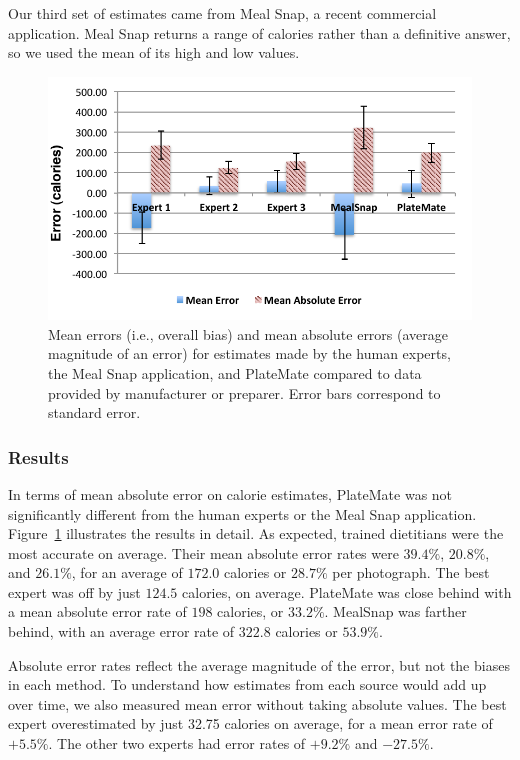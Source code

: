 Our third set of estimates came from Meal Snap, a recent commercial application.  Meal Snap returns a range of calories rather than a definitive answer, so we used the mean of its high and low values.  

\begin{figure}
\begin{center}
   \includegraphics[width=\columnwidth]{figs/error-both}
   \caption{Mean errors (i.e., overall bias) and mean absolute errors (average magnitude of an error) for estimates made by the human experts, the Meal Snap application, and PlateMate compared to data provided by manufacturer or preparer.  Error bars correspond to standard error.}
   \label{fig:error}
\end{center}
\end{figure}

\subsubsection{Results}

In terms of mean absolute error on calorie estimates, PlateMate was not significantly different from the human experts or the Meal Snap application.  Figure~\ref{fig:error} illustrates the results in detail.  
As expected, trained dietitians were the most accurate on average. Their mean absolute error rates were $39.4\%$, $20.8\%$, and $26.1\%$, for an average of $172.0$ calories or $28.7\%$ per photograph. The best expert was off by just $124.5$ calories, on average. PlateMate was close behind with a mean absolute error rate of $198$ calories, or $33.2\%$.  MealSnap was farther behind, with an average error rate of $322.8$ calories or $53.9\%$.

Absolute error rates reflect the average magnitude of the error, but not the biases in each method. To understand how estimates from each source would add up over time, we also measured mean error without taking absolute values. The best expert overestimated by just 32.75 calories on average, for a mean error rate of $+5.5\%$.  The other two experts had error rates of $+9.2\%$ and $-27.5\%$.

